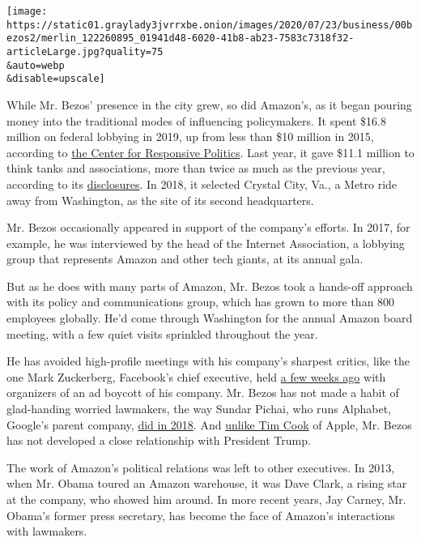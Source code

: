 \texttt{[image: https://static01.graylady3jvrrxbe.onion/images/2020/07/23/business/00bezos2/merlin\_122260895\_01941d48-6020-41b8-ab23-7583c7318f32-articleLarge.jpg?quality=75\\\&auto=webp\\\&disable=upscale]}

While Mr. Bezos' presence in the city grew, so did Amazon's, as it began
pouring money into the traditional modes of influencing policymakers. It
spent \$16.8 million on federal lobbying in 2019, up from less than \$10
million in 2015, according to \href{https://www.opensecrets.org/}{the
Center for Responsive Politics}. Last year, it gave \$11.1 million to
think tanks and associations, more than twice as much as the previous
year, according to its
\href{https://s2.q4cdn.com/299287126/files/doc_downloads/political_expenditures_statement/2018-Political-Expenditures-Statement.pdf}{disclosures}.
In 2018, it selected Crystal City, Va., a Metro ride away from
Washington, as the site of its second headquarters.

Mr. Bezos occasionally appeared in support of the company's efforts. In
2017, for example, he was interviewed by the head of the Internet
Association, a lobbying group that represents Amazon and other tech
giants, at its annual gala.

But as he does with many parts of Amazon, Mr. Bezos took a hands-off
approach with its policy and communications group, which has grown to
more than 800 employees globally. He'd come through Washington for the
annual Amazon board meeting, with a few quiet visits sprinkled
throughout the year.

He has avoided high-profile meetings with his company's sharpest
critics, like the one Mark Zuckerberg, Facebook's chief executive, held
\href{https://www.nytimes3xbfgragh.onion/2020/07/07/technology/facebook-ad-boycott-civil-rights.html}{a
few weeks ago} with organizers of an ad boycott of his company. Mr.
Bezos has not made a habit of glad-handing worried lawmakers, the way
Sundar Pichai, who runs Alphabet, Google's parent company,
\href{https://www.nytimes3xbfgragh.onion/2018/09/28/technology/google-pichai-congress-testify.html}{did
in 2018}. And
\href{https://www.nytimes3xbfgragh.onion/2019/11/20/us/politics/trump-texas-apple-factory.html}{unlike
Tim Cook} of Apple, Mr. Bezos has not developed a close relationship
with President Trump.

The work of Amazon's political relations was left to other executives.
In 2013, when Mr. Obama toured an Amazon warehouse, it was Dave Clark, a
rising star at the company, who showed him around. In more recent years,
Jay Carney, Mr. Obama's former press secretary, has become the face of
Amazon's interactions with lawmakers.

